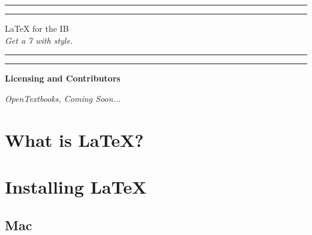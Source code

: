 \documentclass[12pt,a4paper]{article}
\begin{document}

\begin{titlepage}
\centering %
\scshape %
\vfill

\rule{\textwidth}{1.6pt}\vspace*{-\baselineskip}\vspace*{2pt}
\rule{\textwidth}{0.4pt}

\vspace{1.5\baselineskip} %
\LARGE{LaTeX for the IB}\\
\vspace{0.2\baselineskip}
\small{\textit{Get a 7 with style.}}
\vspace{0.75\baselineskip} %

\rule{\textwidth}{0.4pt}\vspace*{-\baselineskip}\vspace{3.2pt}
\rule{\textwidth}{1.6pt}

\vfill
\end{titlepage}



\begin{center}
\Large{\textbf{Licensing and Contributors}}

\vfill
\small{\textit{OpenTextbooks, Coming Soon\texttrademark...}}
\vfill

\newpage
\end{center}

\begin{center}
\tableofcontents
\newpage
\end{center}

\section{What is LaTeX?}


\section{Installing LaTeX}

\subsection{Mac}
\end{document}
